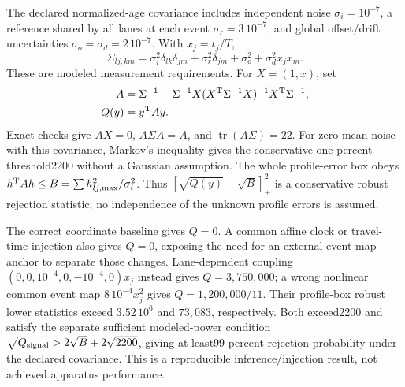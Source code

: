 The declared normalized-age covariance includes independent noise
$\sigma_i=10^{-7}$, a reference shared by all lanes at each event
$\sigma_r=3\,10^{-7}$, and global offset/drift uncertainties
$\sigma_o=\sigma_d=2\,10^{-7}$. With $x_j=t_j/T$,
\[
 \Sigma_{lj,km}=\sigma_i^2\delta_{lk}\delta_{jm}
 +\sigma_r^2\delta_{jm}+\sigma_o^2+\sigma_d^2x_jx_m.
\]
These are modeled measurement requirements. For $X=(1,x)$, set
\[
 \begin{aligned}
 A={}&\Sigma^{-1}-\Sigma^{-1}X
 (X^{\rm T}\Sigma^{-1}X)^{-1}X^{\rm T}\Sigma^{-1},\\
 Q(y)={}&y^{\rm T}Ay.
 \end{aligned}
\]
Exact checks give $AX=0$, $A\Sigma A=A$, and $\operatorname{tr}(A\Sigma)=22$.
For zero-mean noise with this covariance, Markov's inequality gives the
conservative one-percent threshold2200 without a Gaussian assumption.
The whole profile-error box obeys
$h^{\rm T}Ah\le B=\sum h_{lj,\max}^2/\sigma_i^2$.
Thus $[\sqrt{Q(y)}-\sqrt B]_+^2$ is a conservative robust rejection
statistic; no independence of the unknown profile errors is assumed.

The correct coordinate baseline gives $Q=0$. A common affine clock or
travel-time injection also gives $Q=0$, exposing the need for an external
event-map anchor to separate those changes. Lane-dependent coupling
$(0,0,10^{-4},0,-10^{-4},0)x_j$ instead gives $Q=3{,}750{,}000$;
a wrong nonlinear common event map $8\,10^{-4}x_j^2$ gives
$Q=1{,}200{,}000/11$. Their profile-box robust lower statistics exceed
$3.52\,10^6$ and $73{,}083$, respectively. Both exceed2200 and satisfy the
separate sufficient modeled-power condition
$\sqrt{Q_{\rm signal}}>2\sqrt B+2\sqrt{2200}$, giving at least99 percent
rejection probability under the declared covariance. This is a reproducible
inference/injection result, not achieved apparatus performance.
